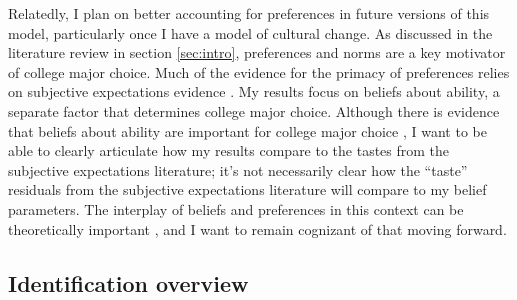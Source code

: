 
Relatedly, I plan on better accounting for preferences in future versions of this model, particularly once I have a model of cultural change. 
As discussed in the literature review in section \ref{sec:intro}, preferences and norms are a key motivator of college major choice.
Much of the evidence for the primacy of preferences relies on subjective expectations evidence \parencite{WZ18,AHMR20}.
My results focus on beliefs about ability, a separate factor that determines college major choice.
Although there is evidence that beliefs about ability are important for college major choice \parencite{O20}, I want to be able to clearly articulate how my results compare to the tastes from the subjective expectations literature; it's not necessarily clear how the ``taste'' residuals from the subjective expectations literature will compare to my belief parameters.
The interplay of beliefs and preferences in this context can be theoretically important \parencite{BG02}, and I want to remain cognizant of that moving forward.

\subsection{Identification overview}\label{sec:identification_overview}

